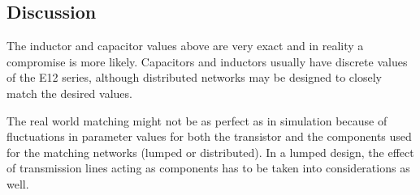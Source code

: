 \documentclass[report.tex]{subfiles}
\begin{document}
\subsection{Discussion}

The inductor and capacitor values above are very exact and in reality a compromise is more likely. Capacitors and inductors usually have discrete values of the E12 series, although distributed networks may be designed to closely match the desired values.

The real world matching might not be as perfect as in simulation because of fluctuations in parameter values for both the transistor and the components used for the matching networks (lumped or distributed). In a lumped design, the effect of transmission lines acting as components has to be taken into considerations as well.
\end{document}
